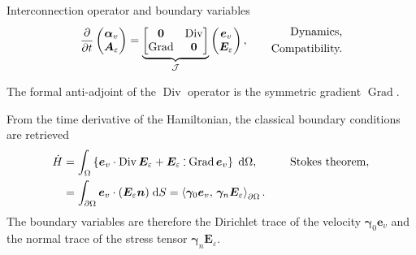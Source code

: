 \documentclass[aspectratio=169]{ISAE-Beamer}
\DeclareMathOperator*{\Grad}{Grad}
\DeclareMathOperator*{\Div}{Div}
\newcommand{\inner}[3][]{\ensuremath{\left\langle #2, \, #3 \right\rangle_{#1}}}
\def\onedot{$\mathsurround0pt\ldotp$}
\def\cddot{%
	\mathbin{\vcenter{\baselineskip.67ex
			\hbox{\onedot}\hbox{\onedot}}%
}}
\begin{document}
\begin{frame}{Interconnection operator and boundary variables}
\begin{equation*}
\displaystyle
\diffp{}{t}
\begin{pmatrix}
\bm{\alpha}_v \\
\bm{A}_\varepsilon
\end{pmatrix} = \underbrace{
	\begin{bmatrix}
	\bm{0} & \Div \\
	\Grad & \bm{0} \\
	\end{bmatrix}}_{\mathcal{J}}
\begin{pmatrix}
\bm{e}_v \\
\bm{E}_\varepsilon
\end{pmatrix}, \qquad \begin{aligned}
\text{Dynamics,} \\ \text{Compatibility.}
\end{aligned}
\end{equation*}
\begin{theorem}{}
	The formal anti-adjoint of the $\Div$ operator is the symmetric gradient $\Grad$.
\end{theorem}
From the time derivative of the Hamiltonian, the classical boundary conditions are retrieved
\begin{equation*}
\begin{aligned}
\dot{H} &= \int_{\Omega} \left\{\bm{e}_v \cdot \Div \bm{E}_\varepsilon + \bm{E}_\varepsilon \cddot \Grad \bm{e}_v \right\}\d\Omega, \qquad &\text{Stokes theorem},\\
&= \int_{\partial \Omega} \bm{e}_v \cdot (\bm{E}_\varepsilon\bm{n}) \d{S} = \inner[\partial\Omega]{\bm\gamma_{0}\bm{e}_v}{\bm\gamma_{n}\bm{E}_\varepsilon}.
\end{aligned}
\end{equation*}
The boundary variables are therefore the Dirichlet trace of the velocity $\bm\gamma_{0}\bm{e}_v$ and the normal trace of the stress tensor $\bm\gamma_{n}\bm{E}_\varepsilon$.
\end{frame}
\end{document}
